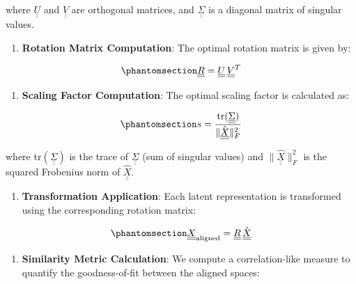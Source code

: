 \documentclass[
]{scrartcl}
\providecommand{\tightlist}{%
  \setlength{\itemsep}{0pt}\setlength{\parskip}{0pt}}
\begin{document}
\begin{refsection}
where \(\underline{\underline{U}}\) and \(\underline{\underline{V}}\)
are orthogonal matrices, and \(\underline{\underline{\Sigma}}\) is a
diagonal matrix of singular values.

\begin{enumerate}
\def\labelenumi{\arabic{enumi}.}
\setcounter{enumi}{3}
\tightlist
\item
  \textbf{Rotation Matrix Computation}: The optimal rotation matrix is
  given by:
\end{enumerate}

\begin{equation}\phantomsection\label{eq-rotation}{
\underline{\underline{R}} = 
\underline{\underline{U}}\,
\underline{\underline{V}}^T
}\end{equation}

\begin{enumerate}
\def\labelenumi{\arabic{enumi}.}
\setcounter{enumi}{4}
\tightlist
\item
  \textbf{Scaling Factor Computation}: The optimal scaling factor is
  calculated as:
\end{enumerate}

\begin{equation}\phantomsection\label{eq-scaling}{
s = \frac{
        \text{tr}(\underline{\underline{\Sigma}})
    }{
        \|\hat{\underline{\underline{X}}}\|_F^2
    }
}\end{equation}

where \(\text{tr}(\underline{\underline{\Sigma}})\) is the trace of
\(\underline{\underline{\Sigma}}\) (sum of singular values) and
\(\|\hat{\underline{\underline{X}}}\|_F^2\) is the squared Frobenius
norm of \(\hat{\underline{\underline{X}}}\).

\begin{enumerate}
\def\labelenumi{\arabic{enumi}.}
\setcounter{enumi}{5}
\tightlist
\item
  \textbf{Transformation Application}: Each latent representation is
  transformed using the corresponding rotation matrix:
\end{enumerate}

\begin{equation}\phantomsection\label{eq-alignment}{
\underline{\underline{X}}_{\text{aligned}} = 
\underline{\underline{R}}\,\hat{\underline{\underline{X}}}
}\end{equation}

\begin{enumerate}
\def\labelenumi{\arabic{enumi}.}
\setcounter{enumi}{6}
\tightlist
\item
  \textbf{Similarity Metric Calculation}: We compute a correlation-like
  measure to quantify the goodness-of-fit between the aligned spaces:
\end{enumerate}


\end{refsection}
\end{document}
